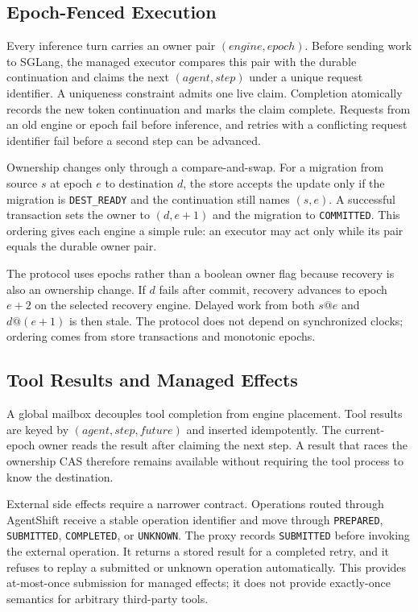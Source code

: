 \subsection{Epoch-Fenced Execution}\label{epoch-fenced-execution}

Every inference turn carries an owner pair \((engine, epoch)\). Before sending work to SGLang, the managed executor compares this pair with the durable continuation and claims the next \((agent, step)\) under a unique request identifier. A uniqueness constraint admits one live claim. Completion atomically records the new token continuation and marks the claim complete. Requests from an old engine or epoch fail before inference, and retries with a conflicting request identifier fail before a second step can be advanced.

Ownership changes only through a compare-and-swap. For a migration from source \(s\) at epoch \(e\) to destination \(d\), the store accepts the update only if the migration is \texttt{DEST\_READY} and the continuation still names \((s,e)\). A successful transaction sets the owner to \((d,e+1)\) and the migration to \texttt{COMMITTED}. This ordering gives each engine a simple rule: an executor may act only while its pair equals the durable owner pair.

The protocol uses epochs rather than a boolean owner flag because recovery is also an ownership change. If \(d\) fails after commit, recovery advances to epoch \(e+2\) on the selected recovery engine. Delayed work from both \(s@e\) and \(d@(e+1)\) is then stale. The protocol does not depend on synchronized clocks; ordering comes from store transactions and monotonic epochs.

\subsection{Tool Results and Managed Effects}\label{tool-results-and-managed-effects}

A global mailbox decouples tool completion from engine placement. Tool results are keyed by \((agent, step, future)\) and inserted idempotently. The current-epoch owner reads the result after claiming the next step. A result that races the ownership CAS therefore remains available without requiring the tool process to know the destination.

External side effects require a narrower contract. Operations routed through AgentShift receive a stable operation identifier and move through \texttt{PREPARED}, \texttt{SUBMITTED}, \texttt{COMPLETED}, or \texttt{UNKNOWN}. The proxy records \texttt{SUBMITTED} before invoking the external operation. It returns a stored result for a completed retry, and it refuses to replay a submitted or unknown operation automatically. This provides at-most-once submission for managed effects; it does not provide exactly-once semantics for arbitrary third-party tools.


